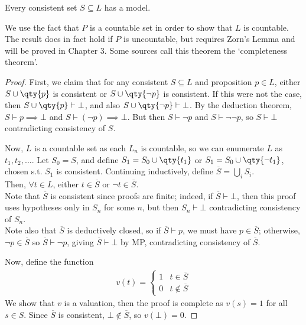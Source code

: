\begin{theorem} \label{thm:mod}
    Every consistent set $S \subseteq L$ has a model.
\end{theorem}

\begin{remark}
    We use the fact that $P$ is a countable set in order to show that $L$ is countable.
    The result does in fact hold if $P$ is uncountable, but requires Zorn's Lemma and will be proved in Chapter 3.
    Some sources call this theorem the `completeness theorem'.
\end{remark}

\begin{proof}
    First, we claim that for any consistent $S \subseteq L$ and proposition $p \in L$, either $S \cup \qty{p}$ is consistent or $S \cup \qty{\neg p}$ is consistent.
    If this were not the case, then $S \cup \qty{p} \vdash \bot$, and also $S \cup \qty{\neg p} \vdash \bot$.
    By the deduction theorem, $S \vdash p \implies \bot$ and $S \vdash (\neg p) \implies \bot$.
    But then $S \vdash \neg p$ and $S \vdash \neg\neg p$, so $S \vdash \bot$ contradicting consistency of $S$.

    Now, $L$ is a countable set as each $L_n$ is countable, so we can enumerate $L$ as $t_1, t_2, \dots$.
    Let $S_0 = S$, and define $S_1 = S_0 \cup \qty{t_1}$ or $S_1 = S_0 \cup \qty{\neg t_1}$, chosen s.t. $S_1$ is consistent.
    Continuing inductively, define $\overline S = \bigcup_{i} S_i$. \\
    Then, $\forall t \in L$, either $t \in \overline S$ or $\neg t \in \overline S$. \\
    Note that $\overline S$ is consistent since proofs are finite; indeed, if $\overline S \vdash \bot$, then this proof uses hypotheses only in $S_n$ for some $n$, but then $S_n \vdash \bot$ contradicting consistency of $S_n$. \\
    Note also that $\overline S$ is deductively closed, so if $\overline S \vdash p$, we must have $p \in \overline S$; otherwise, $\neg p \in \overline S$ so $\overline S \vdash \neg p$, giving $\overline S \vdash \bot$ by MP, contradicting consistency of $\overline S$.

    Now, define the function
    \begin{align*}
    v(t) = \begin{cases}
            1 & t \in \overline S \\
            0 & t \not\in \overline S
        \end{cases}
    \end{align*}
    We show that $v$ is a valuation, then the proof is complete as $v(s) = 1$ for all $s \in S$.
    Since $\overline S$ is consistent, $\bot \not\in \overline S$, so $v(\bot) = 0$.


\end{proof}
